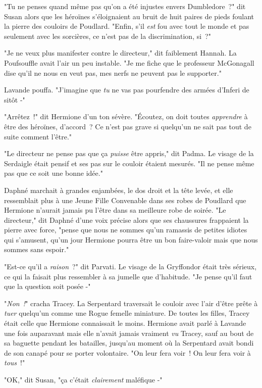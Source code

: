 "Tu ne penses quand même pas qu'on a été injustes envers Dumbledore~?" dit Susan alors que les héroïnes s'éloignaient au bruit de huit paires de pieds foulant la pierre des couloirs de Poudlard. "Enfin, s'il \emph{est} fou avec tout le monde et pas seulement avec les sorcières, ce n'est pas de la discrimination, si~?"

"Je ne veux plus manifester contre le directeur," dit faiblement Hannah. La Poufsouffle avait l'air un peu instable. "Je me fiche que le professeur McGonagall dise qu'il ne nous en veut pas, mes nerfs ne peuvent pas le supporter."

Lavande pouffa. "J'imagine que \emph{tu} ne vas pas pourfendre des armées d'Inferi de sitôt -"

"Arrêtez~!" dit Hermione d'un ton sévère. "Écoutez, on doit toutes \emph{apprendre} à être des héroïnes, d'accord~? Ce n'est pas grave si quelqu'un ne sait pas tout de suite comment l'être."

"Le directeur ne pense pas que ça \emph{puisse} être appris," dit Padma. Le visage de la Serdaigle était pensif et ses pas sur le couloir étaient mesurés. "Il ne pense même pas que ce soit une bonne idée."

Daphné marchait à grandes enjambées, le dos droit et la tête levée, et elle ressemblait plus à une Jeune Fille Convenable dans ses robes de Poudlard que Hermione n'aurait jamais pu l'être dans sa meilleure robe de soirée. "Le directeur," dit Daphné d'une voix précise alors que ses chaussures frappaient la pierre avec force, "pense que nous ne sommes qu'un ramassis de petites idiotes qui s'amusent, qu'un jour Hermione pourra être un bon faire-valoir mais que nous sommes sans espoir."

"Est-ce qu'il a \emph{raison}~?" dit Parvati. Le visage de la Gryffondor était très sérieux, ce qui la faisait plus ressembler à sa jumelle que d'habitude. "Je pense qu'il faut que la question soit posée -"

"\emph{Non~!}" cracha Tracey. La Serpentard traversait le couloir avec l'air d'être prête à \emph{tuer} quelqu'un comme une Rogue femelle miniature. De toutes les filles, Tracey était celle que Hermione connaissait le moins. Hermione avait parlé à Lavande une fois auparavant mais elle n'avait jamais vraiment \emph{vu} Tracey, sauf au bout de sa baguette pendant les batailles, jusqu'au moment où la Serpentard avait bondi de son canapé pour se porter volontaire. "On leur fera voir~! On leur fera voir à \emph{tous}~!"

"OK," dit Susan, "ça c'était \emph{clairement} maléfique -"

